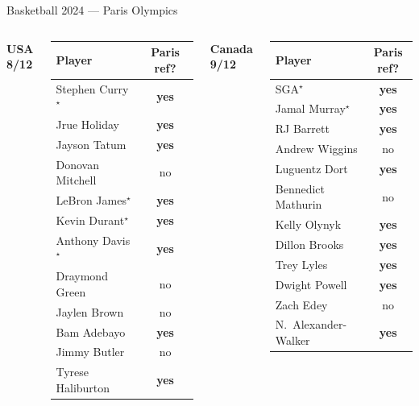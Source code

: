 \documentclass[aspectratio=169,11pt]{beamer}
\newcommand{\good}[1]{\textcolor{bgrn}{\textbf{#1}}}
\begin{document}
\begin{frame}{Basketball 2024 — Paris Olympics}
\begin{columns}[T]
\textbf{USA}  \quad \good{8/12}
\vspace{0.2em}
\small\begin{tabular}{lc}
\toprule
Player & Paris ref? \\
\midrule
Stephen Curry$^\star$  & \good{yes} \\
Jrue Holiday            & \good{yes} \\
Jayson Tatum            & \good{yes} \\
Donovan Mitchell        & no         \\
LeBron James$^\star$   & \good{yes} \\
Kevin Durant$^\star$   & \good{yes} \\
Anthony Davis$^\star$  & \good{yes} \\
Draymond Green          & no         \\
Jaylen Brown            & no         \\
Bam Adebayo             & \good{yes} \\
Jimmy Butler            & no         \\
Tyrese Haliburton       & \good{yes} \\
\bottomrule
\end{tabular}

\textbf{Canada}  \quad \good{9/12}
\vspace{0.2em}
\small\begin{tabular}{lc}
\toprule
Player & Paris ref? \\
\midrule
SGA$^\star$             & \good{yes} \\
Jamal Murray$^\star$   & \good{yes} \\
RJ Barrett              & \good{yes} \\
Andrew Wiggins          & no         \\
Luguentz Dort           & \good{yes} \\
Bennedict Mathurin      & no         \\
Kelly Olynyk            & \good{yes} \\
Dillon Brooks           & \good{yes} \\
Trey Lyles              & \good{yes} \\
Dwight Powell           & \good{yes} \\
Zach Edey               & no         \\
N.\ Alexander-Walker    & \good{yes} \\
\bottomrule
\end{tabular}
\end{columns}
\end{frame}
\end{document}
